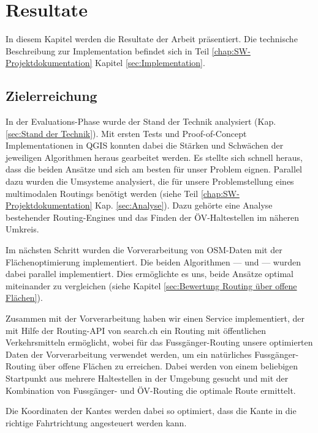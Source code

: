 \section{Resultate}
\label{sec:Resultate}

In diesem Kapitel werden die Resultate der Arbeit präsentiert. Die technische Beschreibung zur Implementation befindet sich in Teil \ref{chap:SW-Projektdokumentation} Kapitel \ref{sec:Implementation}.

\subsection{Zielerreichung}
\label{sub:Zielerreichung}

In der Evaluations-Phase wurde der Stand der Technik analysiert (Kap. \ref{sec:Stand der Technik}). Mit ersten Tests und Proof-of-Concept Implementationen in QGIS konnten dabei die Stärken und Schwächen der jeweiligen Algorithmen heraus gearbeitet werden. Es stellte sich schnell heraus, dass die beiden Ansätze  und  sich am besten für unser Problem eignen. Parallel dazu wurden die Umsysteme analysiert, die für unsere Problemstellung eines multimodalen Routings benötigt werden (siehe Teil \ref{chap:SW-Projektdokumentation} Kap. \ref{sec:Analyse}). Dazu gehörte eine Analyse bestehender Routing-Engines und das Finden der ÖV-Haltestellen im näheren Umkreis.

Im nächsten Schritt wurden die Vorverarbeitung von \ac{OSM}-Daten mit der Flächenoptimierung implementiert. Die beiden Algorithmen ---  und  --- wurden dabei parallel implementiert. Dies ermöglichte es uns, beide Ansätze optimal miteinander zu vergleichen (siehe Kapitel \ref{sec:Bewertung Routing über offene Flächen}).

Zusammen mit der Vorverarbeitung haben wir einen Service \cite{github:PlazaRoute} implementiert, der mit Hilfe der Routing-API von search.ch \cite{search_ch_route_api} ein Routing mit öffentlichen Verkehrsmitteln ermöglicht, wobei für das Fussgänger-Routing unsere optimierten Daten der Vorverarbeitung verwendet werden, um ein natürliches Fussgänger-Routing über offene Flächen zu erreichen. Dabei werden von einem beliebigen Startpunkt aus mehrere Haltestellen in der Umgebung gesucht und mit der Kombination von Fussgänger- und ÖV-Routing die optimale Route ermittelt.

Die Koordinaten der \glspl{Kante} werden dabei so optimiert, dass die Kante in die richtige Fahrtrichtung angesteuert werden kann.

